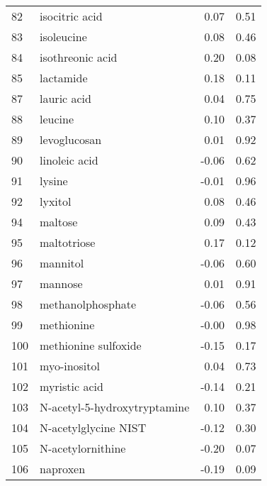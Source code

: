 \begin{tabular}{llrr}
82  &                     isocitric acid &                 0.07 &     0.51 \\
83  &                         isoleucine &                 0.08 &     0.46 \\
84  &                   isothreonic acid &                 0.20 &     0.08 \\
85  &                          lactamide &                 0.18 &     0.11 \\
87  &                        lauric acid &                 0.04 &     0.75 \\
88  &                            leucine &                 0.10 &     0.37 \\
89  &                       levoglucosan &                 0.01 &     0.92 \\
90  &                      linoleic acid &                -0.06 &     0.62 \\
91  &                             lysine &                -0.01 &     0.96 \\
92  &                            lyxitol &                 0.08 &     0.46 \\
94  &                            maltose &                 0.09 &     0.43 \\
95  &                        maltotriose &                 0.17 &     0.12 \\
96  &                           mannitol &                -0.06 &     0.60 \\
97  &                            mannose &                 0.01 &     0.91 \\
98  &                  methanolphosphate &                -0.06 &     0.56 \\
99  &                         methionine &                -0.00 &     0.98 \\
100 &               methionine sulfoxide &                -0.15 &     0.17 \\
101 &                       myo-inositol &                 0.04 &     0.73 \\
102 &                      myristic acid &                -0.14 &     0.21 \\
103 &       N-acetyl-5-hydroxytryptamine &                 0.10 &     0.37 \\
104 &               N-acetylglycine NIST &                -0.12 &     0.30 \\
105 &                  N-acetylornithine &                -0.20 &     0.07 \\
106 &                           naproxen &                -0.19 &     0.09 \\

\end{tabular}
